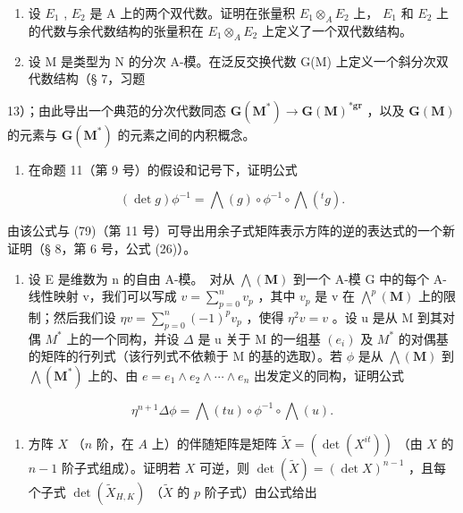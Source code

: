 \begin{enumerate}
\def\labelenumi{\arabic{enumi}.}
\setcounter{enumi}{4}
\item
  设 \(E_{1}\) , \(E_{2}\) 是 A 上的两个双代数。证明在张量积 \(E_{1} \otimes_{A} E_{2}\) 上， \(E_{1}\) 和 \(E_{2}\) 上的代数与余代数结构的张量积在 \(E_{1} \otimes_{A} E_{2}\) 上定义了一个双代数结构。
\item
  设 M 是类型为 N 的分次 A-模。在泛反交换代数 G(M) 上定义一个斜分次双代数结构（§ 7，习题
\end{enumerate}

13）；由此导出一个典范的分次代数同态 \(\mathbf{G}(\mathbf{M}^{*}) \to \mathbf{G}(\mathbf{M})^{*\mathbf{gr}}\) ，以及 \(\mathbf{G}(\mathbf{M})\) 的元素与 \(\mathbf{G}(\mathbf{M}^{*})\) 的元素之间的内积概念。

\begin{enumerate}
\def\labelenumi{\arabic{enumi}.}
\setcounter{enumi}{6}
\tightlist
\item
  在命题 11（第 9 号）的假设和记号下，证明公式
\end{enumerate}

\[
(\det g) \phi^ {- 1} = \bigwedge (g) \circ \phi^ {- 1} \circ \bigwedge (^ {t} g).
\]

由该公式与 (79)（第 11 号）可导出用余子式矩阵表示方阵的逆的表达式的一个新证明（§ 8，第 6 号，公式 (26)）。

\begin{enumerate}
\def\labelenumi{\arabic{enumi}.}
\setcounter{enumi}{7}
\tightlist
\item
  设 E 是维数为 n 的自由 A-模。~对从 \(\bigwedge(\mathbf{M})\) 到一个 A-模 G 中的每个 A-线性映射 v，我们可以写成 \(v = \sum_{p=0}^{n} v_{p}\) ，其中 \(v_{p}\) 是 v 在 \(\bigwedge^{p}(\mathbf{M})\) 上的限制；然后我们设 \(\eta v = \sum_{p=0}^{n} (-1)^{p} v_{p}\) ，使得 \(\eta^{2} v = v\) 。设 u 是从 M 到其对偶 \(M^{*}\) 上的一个同构，并设 \(\Delta\) 是 u 关于 M 的一组基 \((e_{i})\) 及 \(M^{*}\) 的对偶基的矩阵的行列式（该行列式不依赖于 M 的基的选取）。若 \(\phi\) 是从 \(\bigwedge(\mathbf{M})\) 到 \(\bigwedge(\mathbf{M}^{*})\) 上的、由 \(e = e_{1} \wedge e_{2} \wedge \cdots \wedge e_{n}\) 出发定义的同构，证明公式
\end{enumerate}

\[
\eta^ {n + 1} \Delta \phi = \bigwedge (t u) \circ \phi^ {- 1} \circ \bigwedge (u).
\]

\begin{enumerate}
\def\labelenumi{\arabic{enumi}.}
\setcounter{enumi}{8}
\tightlist
\item
  方阵 \(X\) （\(n\) 阶，在 \(A\) 上）的伴随矩阵是矩阵 \(\tilde{X} = (\det(X^{it}))\) （由 \(X\) 的 \(n - 1\) 阶子式组成）。证明若 \(X\) 可逆，则 \(\det(\tilde{X}) = (\det X)^{n-1}\) ，且每个子式 \(\det(\tilde{X}_{H,K})\) （\(\tilde{X}\) 的 \(p\) 阶子式）由公式给出
\end{enumerate}

